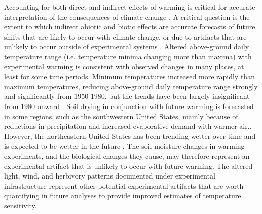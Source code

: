 \documentclass{article}
\begin{document}
\par Accounting for both direct and indirect effects of warming is critical for accurate interpretation of the consequences of climate change \citep{kharouba2015}. %
A critical question is the extent to which indirect abiotic and biotic effects are accurate forecasts of future shifts that are likely to occur with climate change, or due to artifacts that are unlikely to occur outside of experimental systems \citep{moise2010,diamond2013}. Altered above-ground daily temperature range (i.e. temperature minima changing more than maxima) with experimental warming is consistent with observed changes in many places, at least for some time periods. Minimum temperatures increased more rapidly than maximum temperatures, reducing above-ground daily temperature range strongly and significantly from 1950-1980, but the trends have been largely insignificant from 1980 onward \citep{thorne2016,vose2005}. Soil drying in conjunction with future warming is forecasted in some regions, such as the southwestern United States, mainly because of reductions in precipitation and increased evaporative demand with warmer air.\citep{dai2013,seager2013}. However, the northeastern United States has been trending wetter over time and is expected to be wetter in the future \citep{seager2014,shuman2017}. The soil moisture changes in warming experiments, and the biological changes they cause, may therefore represent an experimental artifact that is unlikely to occur with future warming. The altered light, wind, and herbivory patterns documented under experimental infrastructure \citep{kennedy1995,moise2010,wolkovich2012,hoeppner2012, clark2014b} represent other potential experimental artifacts that are worth quantifying in future analyses to provide improved estimates of temperature sensitivity.
\end{document}
